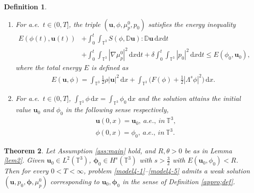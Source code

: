 \documentclass[reqno,a4paper,11pt]{amsart}
\theoremstyle{plain}
\newtheorem{theorem}{Theorem}[section]
\newtheorem{definition}[theorem]{Definition}
\numberwithin{equation}{section}
\newcommand{\bb}[1]{\mathbb{#1}}
\newcommand{\bbt}{\bb{T}}
\newcommand{\bu}{\mathbf{u}}
\newcommand{\absm}[1]{\vert #1 \vert}
\begin{document}
\begin{definition}
\begin{enumerate}
\begin{align}
		\end{align}
		where
		\begin{align*}
			(\overline{\mu},\psi)_{Q_{T}}=\frac{1}{\absm{\bbt^3}}\int_0^{T}\int_{\mathbb{T}^{3}}\big(F'(\phi)\psi -\Lambda^{s} \phi\Lambda^{s} \psi\big) dxdt.
		\end{align*}
		\item For a.e.~$t \in (0,T]$, the triple $(\bu,\phi,\mu_p^0,p_{0})$ satisfies the energy inequality
		\begin{align}\label{ConEnL2}
			\nonumber E(\phi(t),\mathbf{u}(t))&+\int_0^{t}\int_{\mathbb{T}^{3}}S(\phi,\mathbb{ D}\mathbf{u}):\mathbb{ D}\mathbf{u}\,\mathrm d x\mathrm dt
			\\&
			+\int_0^{t}\int_{\mathbb{T}^{3}}|\nabla \mu_{p}^{0}|^{2}\,\mathrm d x\mathrm dt+\delta\int_0^{t}\int_{\mathbb{T}^{3}}|{p}_{0}|^{2}\,\mathrm d x\mathrm dt\leq E(\phi_0,\mathbf{u}_0),
		\end{align}
		where the total energy $E$ is defined as
		\begin{align*}%
			E(\mathbf{u}, \phi)=
			\int_{\mathbb{T}^{3}}\frac{1}{2}\rho|\mathbf{u}|^2\, \mathrm{d} x+
			\int_{\mathbb{T}^{3}}\Big( F(\phi)+\frac{1}{2}|\Lambda^{s} \phi|^2\Big)\, \mathrm dx.
		\end{align*}
		\item For a.e.~$t \in (0,T]$,  $\int_{\mathbb{T}^{3}}\phi\, \mathrm{d} x=\int_{\mathbb{T}^{3}}\phi_0\, \mathrm{d} x$ 
		and the solution attains the initial value $\mathbf{u}_{0}$ and $\phi_{0}$ in  the following sense respectively,
		\begin{align}
			& \mathbf{u}(0,x)=\mathbf{u}_{0},\  a.e.,\ in \ \mathbb{T}^{3},\label{appinitial data-1}
			\\&\phi(0,x)=\phi_{0},\  a.e.,\ in \ \mathbb{T}^{3}.\label{appinitial data-2}
		\end{align}
	\end{enumerate}
	
	
\end{definition}
\begin{theorem}\label{main theorem2}
	Let Assumption \ref{ass:main} hold, and $R,\theta>0$ be as in Lemma \ref{lem2}. Given $\mathbf{u}_{0}\in L^{2}(\mathbb{T}^{3})$, $\mathbf{\phi}_{0}\in H^{s}(\mathbb{T}^{3})$ with $s>\frac{3}{2}$ with $E(\mathbf{u}_{0}, \phi_{0})<R$.
	Then for every $0<T<\infty$, problem \eqref{model4-1}--\eqref{model4-5} admits a weak solution $(\mathbf{u}, p_{0}, \mathbf{\phi},\mu_{p}^{0})$ corresponding to $\mathbf{u}_{0},\mathbf{\phi}_{0}$ in the sense
	of Definition \ref{appro;def}.
	
\end{theorem}
\end{document}
